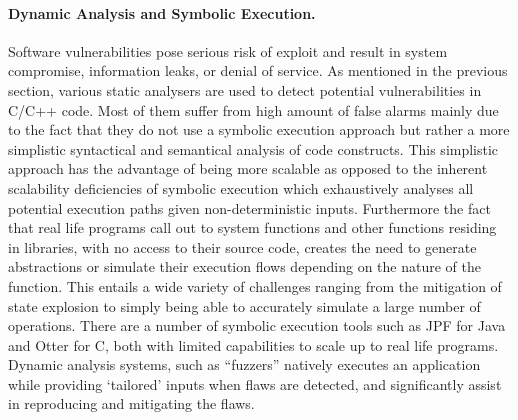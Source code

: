 \documentclass[a4paper,11pt]{article}
\newcommand{\project}[1]{\textbf{#1}\xspace}
\newcommand{\SECURITY}{\project{Elysian}}
\newcommand{\TheProject}{\SECURITY}
\begin{document}
\paragraph{Dynamic Analysis and Symbolic Execution.}
Software vulnerabilities pose serious risk of exploit and result in system compromise, information leaks, or denial of service. As mentioned in the previous section, various static analysers are used to detect potential vulnerabilities in C/C++ code. Most of them suffer from high amount of false alarms mainly due to the fact that they do not use a symbolic execution approach but rather a more simplistic syntactical and semantical analysis of code constructs. This simplistic approach has the advantage of being more scalable as opposed to the inherent scalability deficiencies of symbolic execution which exhaustively analyses all potential execution paths given non-deterministic inputs. Furthermore the fact that real life programs call out to system functions and other functions residing in libraries, with no access to their source code, creates the need to generate abstractions or simulate their execution flows depending on the nature of the function. This entails a wide variety of challenges ranging from the mitigation of state explosion to simply being able to accurately simulate a large number of operations. There are a number of symbolic execution tools such as JPF for Java and Otter for C, both with limited capabilities to scale up to real life programs.
%
Dynamic analysis systems, such as “fuzzers” natively executes an application while providing ‘tailored’ inputs when flaws are detected, and significantly assist in reproducing and mitigating the flaws. 

\end{document}
